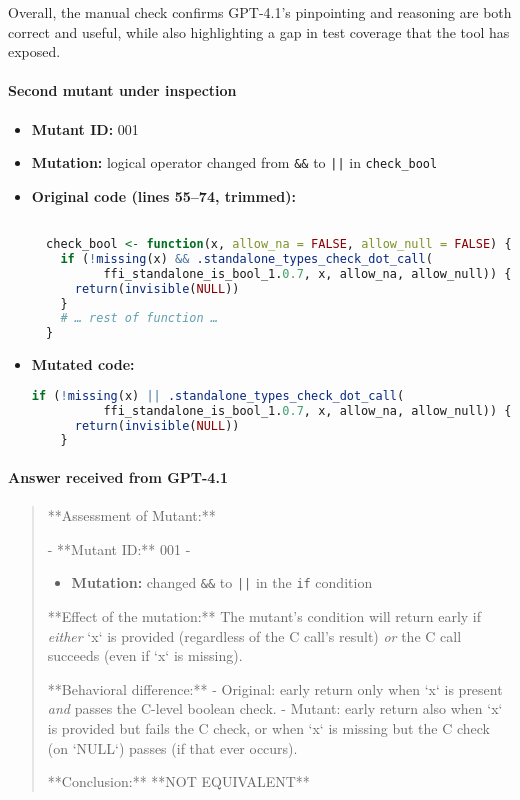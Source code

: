 Overall, the manual check confirms GPT-4.1’s pinpointing and reasoning are both correct and useful, while also highlighting a gap in test coverage that the tool has exposed.

\paragraph{Second mutant under inspection}
\begin{itemize}
    \item \textbf{Mutant ID:} 001       
    \item \textbf{Mutation:} logical operator changed from \texttt{\&\&} to \texttt{||} in \texttt{check\_bool}
    \item \textbf{Original code (lines 55–74, trimmed):}
\begin{lstlisting}[language=R]

  check_bool <- function(x, allow_na = FALSE, allow_null = FALSE) {
    if (!missing(x) && .standalone_types_check_dot_call(
          ffi_standalone_is_bool_1.0.7, x, allow_na, allow_null)) {
      return(invisible(NULL))
    }
    # … rest of function …
  }
  \end{lstlisting}
  \item \textbf{Mutated code:}
  \begin{lstlisting}[language=R]
    if (!missing(x) || .standalone_types_check_dot_call(
          ffi_standalone_is_bool_1.0.7, x, allow_na, allow_null)) {
      return(invisible(NULL))
    }
  \end{lstlisting}
\end{itemize}

\paragraph{Answer received from GPT-4.1}
\begin{quote}
**Assessment of Mutant:**

- **Mutant ID:** 001  
- \begin{itemize}
  \item \textbf{Mutation:} changed \texttt{\&\&} to \texttt{||} in the \texttt{if} condition
\end{itemize}


**Effect of the mutation:**  
The mutant’s condition will return early if \emph{either} `x` is provided (regardless of the C call’s result) \emph{or} the C call succeeds (even if `x` is missing).  

**Behavioral difference:**  
- Original: early return only when `x` is present \emph{and} passes the C-level boolean check.  
- Mutant: early return also when `x` is provided but fails the C check, or when `x` is missing but the C check (on `NULL`) passes (if that ever occurs).

**Conclusion:**  
**NOT EQUIVALENT**
\end{quote}

